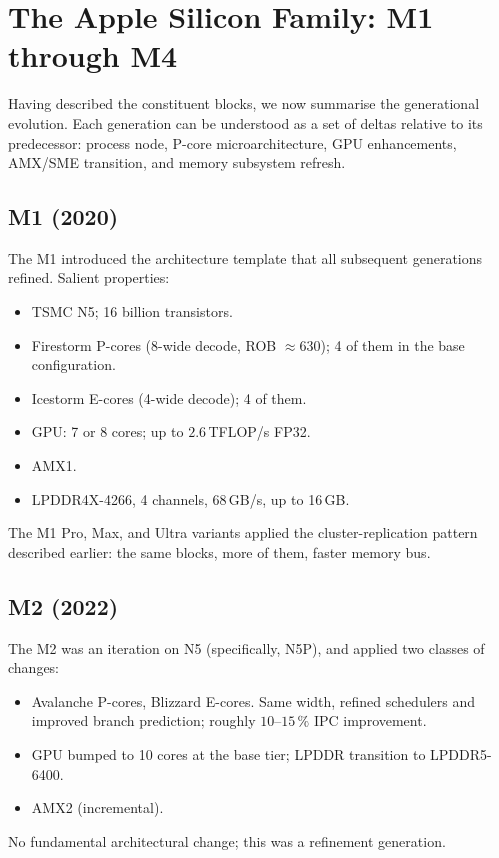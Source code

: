 \section{The Apple Silicon Family: M1 through M4}
\label{sec:apple_silicon:generations}

Having described the constituent blocks, we now summarise the
generational evolution. Each generation can be understood as a set of
deltas relative to its predecessor: process node, P-core
microarchitecture, GPU enhancements, AMX/SME transition, and memory
subsystem refresh.

\subsection{M1 (2020)}
\label{ssec:apple_silicon:m1}

The M1 introduced the architecture template that all subsequent
generations refined. Salient properties:
\begin{itemize}
  \item TSMC N5; 16 billion transistors.
  \item Firestorm P-cores (8-wide decode, ROB $\approx 630$); 4 of
    them in the base configuration.
  \item Icestorm E-cores (4-wide decode); 4 of them.
  \item GPU: 7 or 8 cores; up to $2.6$\,TFLOP/s FP32.
  \item AMX1.
  \item LPDDR4X-4266, 4 channels, 68\,GB/s, up to 16\,GB.
\end{itemize}
The M1 Pro, Max, and Ultra variants applied the cluster-replication
pattern described earlier: the same blocks, more of them, faster
memory bus.

\subsection{M2 (2022)}
\label{ssec:apple_silicon:m2}

The M2 was an iteration on N5 (specifically, N5P), and applied two
classes of changes:
\begin{itemize}
  \item Avalanche P-cores, Blizzard E-cores. Same width, refined
    schedulers and improved branch prediction; roughly $10$--$15\,\%$
    IPC improvement.
  \item GPU bumped to 10 cores at the base tier; LPDDR transition to
    LPDDR5-6400.
  \item AMX2 (incremental).
\end{itemize}
No fundamental architectural change; this was a refinement
generation.

